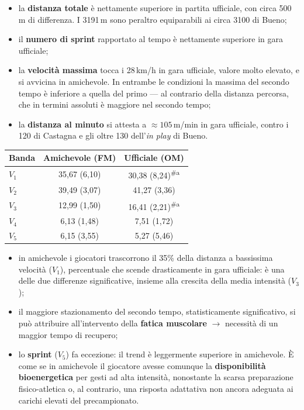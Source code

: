 \begin{itemize}
  \item la \textbf{distanza totale} è nettamente superiore in partita ufficiale, con circa 500\,m di
    differenza. I 3191\,m sono peraltro equiparabili ai circa 3100 di Bueno;
  \item il \textbf{numero di sprint} rapportato al tempo è nettamente superiore in gara ufficiale;
  \item la \textbf{velocità massima} tocca i 28\,km/h in gara ufficiale, valore molto elevato, e si
    avvicina in amichevole. In entrambe le condizioni la massima del secondo tempo è inferiore a
    quella del primo --- al contrario della distanza percorsa, che in termini assoluti è maggiore
    nel secondo tempo;
  \item la \textbf{distanza al minuto} si attesta a $\approx 105$\,m/min in gara ufficiale, contro i
    120 di Castagna e gli oltre 130 dell'\textit{in play} di Bueno.
\end{itemize}


\begin{center}
\footnotesize
\begin{tabular}{|l|c|c|}
\hline
\textbf{Banda} & \textbf{Amichevole (FM)} & \textbf{Ufficiale (OM)} \\
\hline
$V_1$ & 35,67 (6,10) & 30,38 (8,24)\textsuperscript{\#a} \\
$V_2$ & 39,49 (3,07) & 41,27 (3,36) \\
$V_3$ & 12,99 (1,50) & 16,41 (2,21)\textsuperscript{\#a} \\
$V_4$ & 6,13 (1,48)  & 7,51 (1,72) \\
$V_5$ & 6,15 (3,55)  & 5,27 (5,46) \\
\hline
\end{tabular}
\end{center}

\begin{itemize}
  \item in amichevole i giocatori trascorrono il 35\% della distanza a bassissima velocità ($V_1$),
    percentuale che scende drasticamente in gara ufficiale: è una delle due differenze
    significative, insieme alla crescita della media intensità ($V_3$);
  \item il maggiore stazionamento del secondo tempo, statisticamente significativo, si può
    attribuire all'intervento della \textbf{fatica muscolare} $\rightarrow$ necessità di un maggior
    tempo di recupero;
  \item lo \textbf{sprint} ($V_5$) fa eccezione: il trend è leggermente superiore in amichevole. È
    come se in amichevole il giocatore avesse comunque la \textbf{disponibilità bioenergetica} per
    gesti ad alta intensità, nonostante la scarsa preparazione fisico-atletica o, al contrario, una
    risposta adattativa non ancora adeguata ai carichi elevati del precampionato.
\end{itemize}

